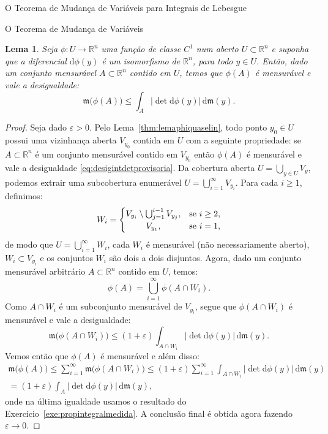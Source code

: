 \documentclass[oneside,final,11pt]{amsbook}
\newcommand{\R}{\mathds R}
\newcommand{\leb}{\mathfrak m}
\newcommand{\dd}{\mathrm d}
\theoremstyle{remark}\newtheorem{exercise}{Exercício}[chapter]
\theoremstyle{remark}\newtheorem{*exercise}[exercise]{\hbox to 0pt{\hskip 0pt minus 1fil*}Exercício}
\theoremstyle{definition}\newtheorem{exdefin}{Definição}[chapter]
\theoremstyle{plain}\newtheorem{teo}{Teorema}[section]
\theoremstyle{plain}\newtheorem{lem}[teo]{Lema}
\theoremstyle{plain}\newtheorem{prop}[teo]{Proposição}
\theoremstyle{plain}\newtheorem{cor}[teo]{Corolário}
\theoremstyle{definition}\newtheorem{defin}[teo]{Definição}
\theoremstyle{remark}\newtheorem{rem}[teo]{Observação}
\theoremstyle{definition}\newtheorem{notation}[teo]{Notação}
\theoremstyle{definition}\newtheorem{convention}[teo]{Convenção}
\theoremstyle{definition}\newtheorem{example}[teo]{Exemplo}
\numberwithin{section}{chapter}
\numberwithin{equation}{section}
\begin{document}
\begin{chapter}{O Teorema de Mudança de Variáveis para Integrais de Lebesgue}
\begin{section}{O Teorema de Mudança de Variáveis}
\begin{lem}\label{thm:lemadesigphi}
Seja $\phi:U\to\R^n$ uma função de classe $C^1$ num aberto $U\subset\R^n$ e suponha que a diferencial
$\dd\phi(y)$ é um isomorfismo de $\R^n$, para todo $y\in U$. Então, dado um conjunto mensurável $A\subset\R^n$
contido em $U$, temos que $\phi(A)$ é mensurável e vale a desigualdade:
\[\leb\big(\phi(A)\big)\le\int_A\big\vert\det\dd\phi(y)\big\vert\,\dd\leb(y).\]
\end{lem}
\begin{proof}
Seja dado $\varepsilon>0$. Pelo Lema~\ref{thm:lemaphiquaselin}, todo ponto $y_0\in U$ possui uma vizinhança aberta
$V_{y_0}$ contida em $U$ com a seguinte propriedade: se $A\subset\R^n$ é um conjunto mensurável contido em $V_{y_0}$ então
$\phi(A)$ é mensurável e vale a desigualdade \eqref{eq:desigintdetprovisoria}. Da cobertura aberta
$U=\bigcup_{y\in U}V_y$, podemos extrair uma subcobertura enumerável $U=\bigcup_{i=1}^\infty V_{y_i}$.
Para cada $i\ge1$, definimos:
\[W_i=\begin{cases}
V_{y_i}\setminus\bigcup_{j=1}^{i-1}V_{y_j},&\text{se $i\ge2$},\\
\hfil V_{y_1},&\text{se $i=1$},
\end{cases}\]
de modo que $U=\bigcup_{i=1}^\infty W_i$, cada $W_i$ é mensurável (não necessariamente aberto), $W_i\subset V_{y_i}$
e os conjuntos $W_i$ são dois a dois disjuntos. Agora, dado um conjunto mensurável arbitrário $A\subset\R^n$ contido
em $U$, temos:
\[\phi(A)=\bigcup_{i=1}^\infty\phi(A\cap W_i).\]
Como $A\cap W_i$ é um subconjunto mensurável de $V_{y_i}$, segue que $\phi(A\cap W_i)$ é mensurável e vale a desigualdade:
\[\leb\big(\phi(A\cap W_i)\big)\le(1+\varepsilon)\int_{A\cap W_i}\big\vert\det\dd\phi(y)\big\vert\,\dd\leb(y).\]
Vemos então que $\phi(A)$ é mensurável e além disso:
\begin{multline*}
\leb\big(\phi(A)\big)\le\sum_{i=1}^\infty\leb\big(\phi(A\cap W_i)\big)\le
(1+\varepsilon)\sum_{i=1}^\infty\int_{A\cap W_i}\big\vert\det\dd\phi(y)\big\vert\,\dd\leb(y)\\
=(1+\varepsilon)\int_A\big\vert\det\dd\phi(y)\big\vert\,\dd\leb(y),
\end{multline*}
onde na última igualdade usamos o resultado do Exercício~\ref{exe:propintegralmedida}. A conclusão final é obtida agora fazendo
$\varepsilon\to0$.
\end{proof}


\end{section}
\end{chapter}
\end{document}
